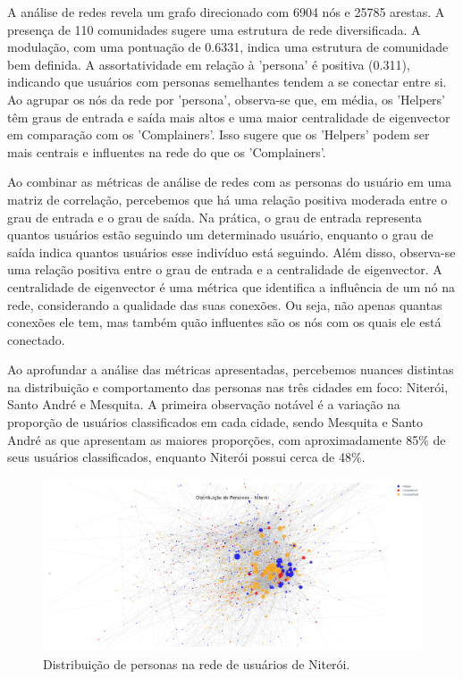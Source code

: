 A análise de redes revela um grafo direcionado com 6904 nós e 25785 arestas. A presença de 110 comunidades sugere uma estrutura de rede diversificada. A modulação, com uma pontuação de 0.6331, indica uma estrutura de comunidade bem definida. A assortatividade em relação à 'persona' é positiva (0.311), indicando que usuários com personas semelhantes tendem a se conectar entre si. Ao agrupar os nós da rede por 'persona', observa-se que, em média, os 'Helpers' têm graus de entrada e saída mais altos e uma maior centralidade de eigenvector em comparação com os 'Complainers'. Isso sugere que os 'Helpers' podem ser mais centrais e influentes na rede do que os 'Complainers'.

Ao combinar as métricas de análise de redes com as personas do usuário em uma matriz de correlação, percebemos que há uma relação positiva moderada entre o grau de entrada e o grau de saída. Na prática, o grau de entrada representa quantos usuários estão seguindo um determinado usuário, enquanto o grau de saída indica quantos usuários esse indivíduo está seguindo. Além disso, observa-se uma relação positiva entre o grau de entrada e a centralidade de eigenvector. A centralidade de eigenvector é uma métrica que identifica a influência de um nó na rede, considerando a qualidade das suas conexões. Ou seja, não apenas quantas conexões ele tem, mas também quão influentes são os nós com os quais ele está conectado.

Ao aprofundar a análise das métricas apresentadas, percebemos nuances distintas na distribuição e comportamento das personas nas três cidades em foco: Niterói, Santo André e Mesquita. A primeira observação notável é a variação na proporção de usuários classificados em cada cidade, sendo Mesquita e Santo André as que apresentam as maiores proporções, com aproximadamente 85\% de seus usuários classificados, enquanto Niterói possui cerca de 48\%.

\begin{figure}[h]
    \centering
    \includegraphics[width=1\textwidth]{images/network_personas_niteroi.png}
    \caption{Distribuição de personas na rede de usuários de Niterói.}
    \label{fig:network_personas_niteroi}
\end{figure}

